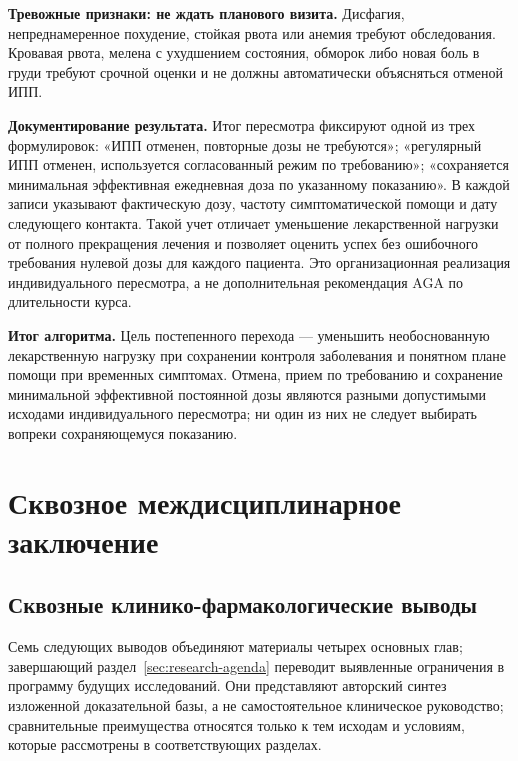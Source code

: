 \documentclass[11pt,a4paper,notitlepage]{report}
\newcommand{\src}[1]{\unskip\space\cite{#1}}
\begin{document}
\textbf{Тревожные признаки: не ждать планового визита.} Дисфагия, непреднамеренное похудение, стойкая рвота или анемия требуют обследования. Кровавая рвота, мелена с ухудшением состояния, обморок либо новая боль в груди требуют срочной оценки и не должны автоматически объясняться отменой ИПП.\src{acggerd}

\textbf{Документирование результата.} Итог пересмотра фиксируют одной из трех формулировок: «ИПП отменен, повторные дозы не требуются»; «регулярный ИПП отменен, используется согласованный режим по требованию»; «сохраняется минимальная эффективная ежедневная доза по указанному показанию». В каждой записи указывают фактическую дозу, частоту симптоматической помощи и дату следующего контакта. Такой учет отличает уменьшение лекарственной нагрузки от полного прекращения лечения и позволяет оценить успех без ошибочного требования нулевой дозы для каждого пациента. Это организационная реализация индивидуального пересмотра, а не дополнительная рекомендация AGA по длительности курса.\src{agadepres,withdrawfarrell2017}

\textbf{Итог алгоритма.} Цель постепенного перехода --- уменьшить необоснованную лекарственную нагрузку при сохранении контроля заболевания и понятном плане помощи при временных симптомах. Отмена, прием по требованию и сохранение минимальной эффективной постоянной дозы являются разными допустимыми исходами индивидуального пересмотра; ни один из них не следует выбирать вопреки сохраняющемуся показанию.\src{agadepres,withdrawfarrell2017}

\chapter{Сквозное междисциплинарное заключение}
\label{chap:conclusion}

\section{Сквозные клинико-фармакологические выводы}
\label{sec:integrated-conclusions}
Семь следующих выводов объединяют материалы четырех основных глав; завершающий раздел~\ref{sec:research-agenda} переводит выявленные ограничения в программу будущих исследований. Они представляют авторский синтез изложенной доказательной базы, а не самостоятельное клиническое руководство; сравнительные преимущества относятся только к тем исходам и условиям, которые рассмотрены в соответствующих разделах.
\end{document}
